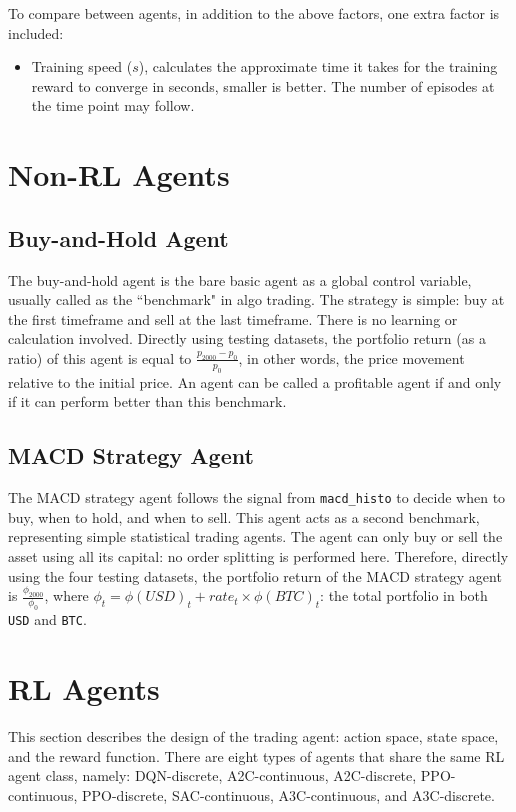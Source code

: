 To compare between agents, in addition to the above factors, one extra factor is included: 
\begin{itemize}
	\item Training speed ($s$), calculates the approximate time it takes for the training reward to converge in seconds, smaller is better. The number of episodes at the time point may follow.
\end{itemize}

\section{Non-RL Agents}
\subsection{Buy-and-Hold Agent}
The buy-and-hold agent is the bare basic agent as a global control variable, usually called as the ``benchmark" in algo trading. The strategy is simple: buy at the first timeframe and sell at the last timeframe. There is no learning or calculation involved. Directly using testing datasets, the portfolio return (as a ratio) of this agent is equal to $\frac{p_{2000} - p_0}{p_0}$, in other words, the price movement relative to the initial price. An agent can be called a profitable agent if and only if it can perform better than this benchmark.

\subsection{MACD Strategy Agent}
The MACD strategy agent follows the signal from \texttt{macd\_histo} to decide when to buy, when to hold, and when to sell. This agent acts as a second benchmark, representing simple statistical trading agents. The agent can only buy or sell the asset using all its capital: no order splitting is performed here. Therefore, directly using the four testing datasets, the portfolio return of the MACD strategy agent is $\frac{\phi_{2000}}{\phi_0}$, where $\phi_t = \phi(USD)_t + rate_t \times \phi(BTC)_t$: the total portfolio in both \texttt{USD} and \texttt{BTC}.

\section{RL Agents}
This section describes the design of the trading agent: action space, state space, and the reward function. There are eight types of agents that share the same RL agent class, namely: DQN-discrete, A2C-continuous, A2C-discrete, PPO-continuous, PPO-discrete, SAC-continuous, A3C-continuous, and A3C-discrete.

